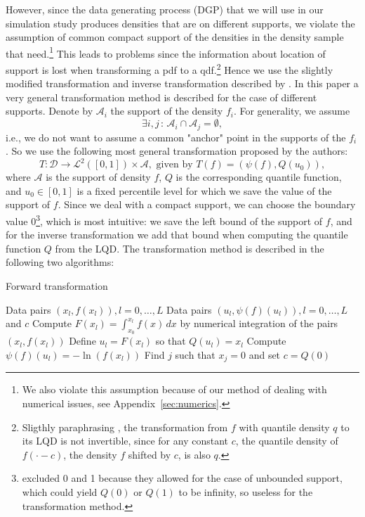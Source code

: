 However, since the data generating process (DGP) that we will use in our simulation study
produces densities that are on different supports, we violate the assumption of common
compact support of the densities in the density sample that \textcite{PetersenMüller2016}
need.\footnote{We also violate this assumption because of our method of dealing with
numerical issues, see Appendix~\ref{sec:numerics}.} This leads to problems since the information
about location of support is lost when transforming a pdf to a qdf.\footnote{Sligthly
paraphrasing \textcite{KokoszkaEtAl2019}, the transformation from $f$ with quantile
density $q$ to its LQD is not invertible, since for any constant $c$, the quantile density of
$f(\cdot - c)$, the density $f$ shifted by $c$, is also $q$.}
Hence we use the slightly modified transformation and inverse transformation described
by \textcite{KokoszkaEtAl2019}. In this paper a very general transformation method is
described for the case of different supports. Denote by $\mathcal{A}_i$ the support of
the density $f_i$. For generality, we assume
\begin{equation*}
    \exists i, j \, : \, \mathcal{A}_i \cap \mathcal{A}_j = \emptyset,
\end{equation*}
i.e., we do not want to assume a common "anchor" point in the supports of the $f_i$. So
we use the following most general transformation proposed by the authors:
\begin{equation}
    T : \mathcal{D} \to \mathcal{L}^2([0,1]) \times \mathcal{A}, \text{ given by } T(f) = (\psi(f), Q(u_0)),
\end{equation}
where $\mathcal{A}$ is the support of density $f$, $Q$ is the corresponding quantile function,
and $u_0 \in [0,1]$ is a fixed percentile level for which we save the value of the support
of $f$. Since we deal with a compact support, we can choose the boundary value
0\footnote{\textcite{KokoszkaEtAl2019} excluded 0 and 1 because they allowed for the case
of unbounded support, which could yield $Q(0)$ or $Q(1)$ to be infinity, so useless for
the transformation method.}, which is most intuitive: we save the left bound of the
support of $f$, and for the inverse transformation we add that bound when computing
the quantile function $Q$ from the LQD. The transformation method is described in the
following two algorithms:

\begin{algorithm}
    \caption{Forward transformation}
    \label{alg:forward}
    \begin{algorithmic}[1]
    \Require Data pairs \( (x_l, f(x_l)), l = 0, \ldots, L \)
    \Ensure Data pairs \( (u_l, \psi(f)(u_l)), l = 0, \ldots, L \) and \( c \)
        \State Compute \( F(x_l) = \int_{x_0}^{x_l} f(x) \, dx \) by numerical integration of the pairs \( (x_l, f(x_l)) \)
        \State Define \( u_l = F(x_l) \) so that \( Q(u_l) = x_l \)
        \State Compute \( \psi(f)(u_l) = -\ln(f(x_l)) \)
        \State Find \( j \) such that \( x_j = 0 \) and set \( c = Q(0) \)
    \EndFor
    \end{algorithmic}
\end{algorithm}

